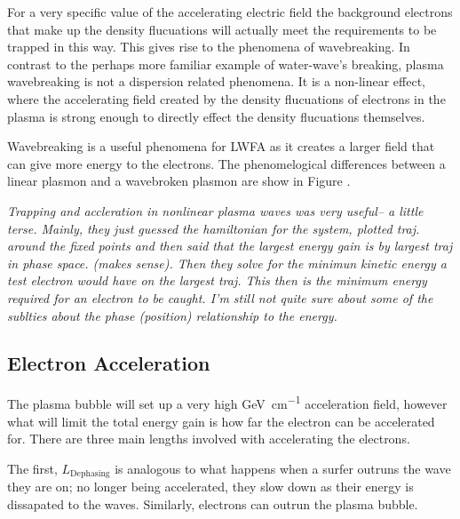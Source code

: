 \documentclass[12pt, titlepage]{article}
\begin{document}

    For a very specific value of the accelerating electric field the background
    electrons that make up the density flucuations will actually meet the
    requirements to be trapped in this way. This gives rise to the phenomena of
    wavebreaking. In contrast to the perhaps more familiar example of water-wave's
    breaking, plasma wavebreaking is not a dispersion related phenomena. It is a
    non-linear effect, where the accelerating field created by the density
    flucuations of electrons in the plasma is strong enough to directly effect the
    density flucuations themselves.

    Wavebreaking is a useful phenomena for LWFA as it creates a larger field that
    can give more energy to the electrons. The phenomelogical differences between a
    linear plasmon and a wavebroken plasmon are show in Figure .

    {\em Trapping and accleration in nonlinear plasma waves was very useful-- a
        little terse. Mainly, they just guessed the hamiltonian for the system,
        plotted traj. around the fixed points and then said that the largest energy
        gain is by largest traj in phase space. (makes sense). Then they solve for
        the minimun kinetic energy a test electron would have on the largest traj.
        This then is the minimum energy required for an electron to be caught. I'm
        still not quite sure about some of the sublties about the phase (position)
    relationship to the energy.}
    \subsection{Electron Acceleration}
    The plasma bubble will set up a very high \si{\giga \electronvolt \per
    \centi \meter} acceleration field, however what will limit the total energy
    gain is how far the electron can be accelerated for. 
    There are three main lengths involved with accelerating the
    electrons.
    
    The first, $L_\mathrm{Dephasing}$ is analogous to what happens
    when a surfer outruns the wave they are on; no longer being accelerated,
    they slow down as their energy is dissapated to the waves. Similarly, electrons
    can outrun the plasma bubble. 
\end{document}
